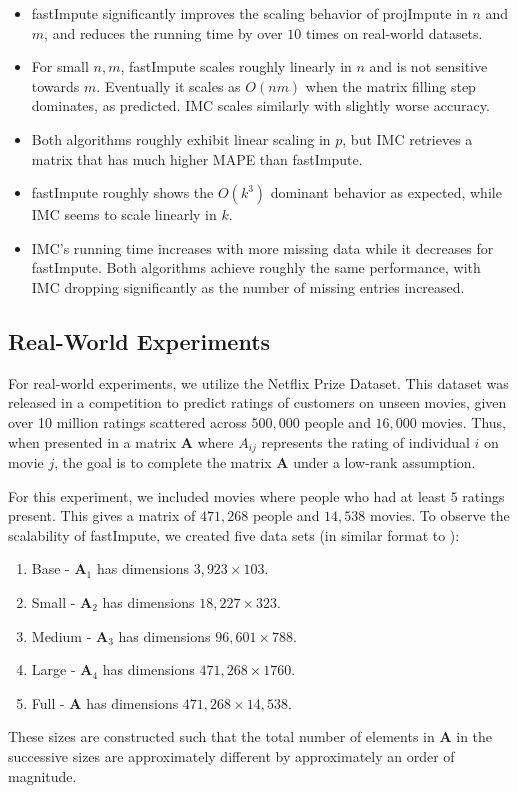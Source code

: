\documentclass[twoside,11pt]{article}
\begin{document}
\begin{itemize}
	\item fastImpute significantly improves the scaling behavior of projImpute in $n$ and $m$, and reduces the running time by over $10$ times on real-world datasets. 
    \item For small $n,m$, fastImpute scales roughly linearly in $n$ and is not sensitive towards $m$. Eventually it scales as $O(nm)$ when the matrix filling step dominates, as predicted. IMC scales similarly with slightly worse accuracy.
    \item Both algorithms roughly exhibit linear scaling in $p$, but IMC retrieves a matrix that has much higher MAPE than fastImpute.
    \item fastImpute roughly shows the $O(k^3)$ dominant behavior as expected, while IMC seems to scale linearly in $k$.
    \item IMC's running time increases with more missing data while it decreases for fastImpute. Both algorithms achieve roughly the same performance, with IMC dropping significantly as the number of missing entries increased.
\end{itemize}
\subsection{Real-World Experiments}
\label{sec:fastImputeSrealexp}
For real-world experiments, we utilize the Netflix Prize Dataset. This dataset was released in a competition to predict ratings of customers on unseen movies, given over 10 million ratings scattered across $500,000$ people and $16,000$ movies. Thus, when presented in a matrix $\bm{A}$ where $A_{ij}$ represents the rating of individual $i$ on movie $j$, the goal is to complete the matrix $\bm{A}$ under a low-rank assumption. 

For this experiment, we  included movies where people who had at least $5$ ratings present. This gives a matrix of  $471,268$ people and $14,538$ movies. To observe the scalability of fastImpute, we created five data sets (in similar format to \cite{bertsimas2018interpretable}):
\begin{enumerate}
	\item Base - $\bm{A}_1$ has  dimensions   $3,923\times 103$.
	\item Small - $\bm{A}_2$ has  dimensions   $18,227\times 323$.
	\item Medium - $\bm{A}_3$ has  dimensions   $96,601\times 788$.
	\item Large - $\bm{A}_4$ has  dimensions   $471,268 \times 1760$.
	\item Full - $\bm{A}$ has  dimensions   $471,268\times 14,538$. 
\end{enumerate}
These sizes are constructed such that the total number of elements in $\bm{A}$ in the successive sizes are approximately different by approximately an order of magnitude.
\end{document}
